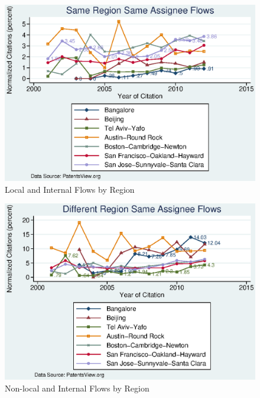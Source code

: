 \documentclass[12pt]{article}
\begin{document}
\begin{figure}[h]
\begin{centering}
  \includegraphics[width=\textwidth]{SameRegionSameAssigneeFlows}
  \caption{Local and Internal Flows by Region}
  \label{fig:SameRegionSameAssigneeFlows}
\end{centering}
\end{figure}


\begin{figure}[h]
\begin{centering}
  \includegraphics[width=\textwidth]{DiffRegionSameAssigneeFlows}
  \caption{Non-local and Internal Flows by Region}
  \label{fig:DiffRegionSameAssigneeFlows}
\end{centering}
\end{figure}
\end{document}
